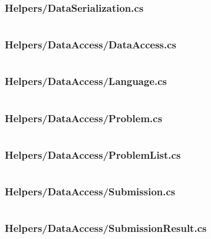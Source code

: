 \documentclass[a4paper]{report}
\begin{document}
\subsubsection{Helpers/DataSerialization.cs}

\inputminted{csharp}{"../src/Algorithm Dynamics.Core/Helpers/DataSerialization.cs"}

\subsubsection{Helpers/DataAccess/DataAccess.cs}

\inputminted{csharp}{"../src/Algorithm Dynamics.Core/Helpers/DataAccess/DataAccess.cs"}

\subsubsection{Helpers/DataAccess/Language.cs}

\inputminted{csharp}{"../src/Algorithm Dynamics.Core/Helpers/DataAccess/Language.cs"}

\subsubsection{Helpers/DataAccess/Problem.cs}

\inputminted{csharp}{"../src/Algorithm Dynamics.Core/Helpers/DataAccess/Problem.cs"}

\subsubsection{Helpers/DataAccess/ProblemList.cs}

\inputminted{csharp}{"../src/Algorithm Dynamics.Core/Helpers/DataAccess/ProblemList.cs"}

\subsubsection{Helpers/DataAccess/Submission.cs}

\inputminted{csharp}{"../src/Algorithm Dynamics.Core/Helpers/DataAccess/Submission.cs"}

\subsubsection{Helpers/DataAccess/SubmissionResult.cs}

\inputminted{csharp}{"../src/Algorithm Dynamics.Core/Helpers/DataAccess/SubmissionResult.cs"}
\end{document}
